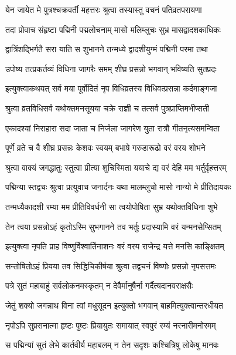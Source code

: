 \twolineshloka
{येन जायेत मे पुत्रश्चक्रवर्ती महत्तरः}
{श्रुत्वा तस्यास्तु वचनं पतिव्रतपरायणा} %

\twolineshloka
{तदा प्रोवाच संहृष्टा पद्मिनी पद्मलोचनाम् मासो}
{मलिम्लुचः सुभ्र मासद्वादशकाधिकः} %

\twolineshloka
{द्वात्रिंशद्भिर्गतै सरा याति स शुभानने}
{तन्मध्ये द्वादशीयुग्मं पद्मिनी परमा तथा} %

\twolineshloka
{उपोष्य तत्प्रकर्तव्यं विधिना जागरैः समम्}
{शीघ्र प्रसन्नो भगवान् भविष्यति सुतप्रदः} %

\twolineshloka
{इत्युक्त्वाकथयत् सर्व मया पूर्वोदितं नृप}
{विधिव्रतस्य विधिवत्प्रसन्ना कर्दमाङ्गजा} %

\twolineshloka
{श्रुत्वा व्रतविधिसर्व यथोक्तमनसूयया}
{चक्रे राज्ञी च तत्सर्व पुत्रप्राप्तिमभीप्सती} %

\twolineshloka
{एकादश्यां निराहारा सदा जाता च निर्जला}
{जागरेण युता रात्रौ गीतनृत्यसमन्विता} %

\twolineshloka
{पूर्णे व्रते च वै शीघ्र प्रसन्नः केशवः स्वयम्}
{बभाषे गरुडारूढो वरं वरय शोभने} %

\twolineshloka
{श्रुत्वा वाक्यं जगद्धातुः स्तुत्वा प्रीत्या शुचिस्मिता}
{ययाचे द्य वरं देहि मम भर्तुर्वृहत्तरम्} %

\twolineshloka
{पद्मिन्या स्तद्वचः श्रुत्वा प्रत्युवाच जनार्दनः}
{यथा मालम्लुचो मासो नान्यो मे प्रीतिदायकः} %

\twolineshloka
{तन्मध्यैकादशी रम्या मम प्रीतिविवर्धनी}
{सा त्वयोपोषिता सुभ्र यथोक्तविधिना शुभे} %

\twolineshloka
{तेन त्वया प्रसन्नोऽहं कृतोऽस्मि सुभगानने}
{तव भर्तुः प्रदास्यामि वरं यन्मनसेप्सितम्} %

\twolineshloka
{इत्युक्त्वा नृपति प्राह विष्णुर्विश्वार्तिनाशनः}
{वरं वरय राजेन्द्र यत्ते मनसि काङ्क्षितम्} %

\twolineshloka
{सन्तोषितोऽहं प्रियया तव सिद्धिचिकीर्षया}
{श्रुत्वा तद्वचनं विष्णोः प्रसन्नो नृपसत्तमः} %

\twolineshloka
{पत्रे सुतं महाबाहुं सर्वलोकनमस्कृतम्}
{न देवैर्मानुषैर्ना गर्दैत्यदानवराक्षसैः} %

\twolineshloka
{जेतुं शक्यो जगन्नाथ विना त्वां मधुसूदन}
{इत्युक्तो भगवान् बाहमित्युक्त्वान्तरधीयत} %

\twolineshloka
{नृपोऽपि सुप्रसनात्मा हृष्टः पुष्टः प्रियायुतः}
{समायात् स्वपुरं रम्यं नरनारीमनोरमम्} %

\twolineshloka
{स पद्मिन्यां सुतं लेभे कार्तवीर्य महाबलम्}
{न तेन सदृशः कश्चित्रिषु लोकेषु मानवः} %

